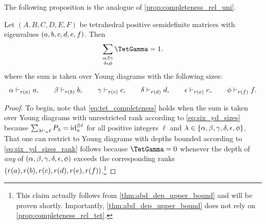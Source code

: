 \documentclass[notitlepage, 10pt]{article}
\begin{document}
The following proposition is the analogue of \cref{prop:completeness_rel_uni}.
\begin{prop}
    \label{prop:completeness_rel_tet}
    Let $(A,B,C,D,E,F)$ be tetrahedral positive semidefinite matrices with eigenvalues $(a,b,c,d,e,f)$.
    Then
    \begin{align}
        \label{eq:tet_completeness}
        \sum_{\substack{\ya \yb \yc \\ \yd \ye \yf}}
        \TetGamma = 1.
    \end{align}
    where the sum is taken over Young diagrams with the following sizes:
    \begin{equation}
        \label{eq:six_yd_sizes_rank}
        \alpha \vdash_{r(a)} a, \qquad
        \beta \vdash_{r(b)} b, \qquad
        \gamma \vdash_{r(c)} c, \qquad
        \delta \vdash_{r(d)} d, \qquad
        \epsilon \vdash_{r(e)} e, \qquad
        \phi \vdash_{r(f)} f.
    \end{equation}
\end{prop}
\begin{proof}
    To begin, note that \cref{eq:tet_completeness} holds when the sum is taken over Young diagrams with unrestricted rank according to \cref{eq:six_yd_sizes} because $\sum_{\lambda \vdash_n \ell} P_{\lambda} = \operatorname{id}_{n}^{\otimes \ell}$ for all positive integers $\ell$ and $\lambda \in \{\alpha, \beta, \gamma, \delta, \epsilon, \phi\}$.
    That one can restrict to Young diagrams with depths bounded according to \cref{eq:six_yd_sizes_rank} follows
    because $\TetGamma = 0$ whenever the depth of \textit{any} of $(\alpha, \beta, \gamma, \delta, \epsilon, \phi)$ exceeds the corresponding ranks $(r(a), r(b), r(c), r(d), r(e), r(f))$.\footnote{This claim actually follows from \cref{thm:abd_dep_upper_bound} and will be proven shortly. Importantly, \cref{thm:abd_dep_upper_bound} does not rely on \cref{prop:completeness_rel_tet}.}
\end{proof}
\end{document}
